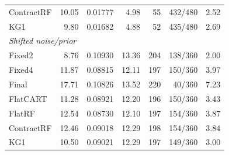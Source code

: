 \begin{table}[!htbp]
\begin{tabular}{@{}lrrrrrr@{}}
ContractRF & 10.05 & 0.01777 & 4.98 & 55 & 432/480 & 2.52\\
KG1 & 9.80 & 0.01682 & 4.88 & 52 & 435/480 & 2.69\\
\multicolumn{7}{l}{\textit{Shifted noise/prior}}\\
Fixed2 & 8.76 & 0.10930 & 13.36 & 204 & 138/360 & 2.00\\
Fixed4 & 11.87 & 0.08815 & 12.11 & 197 & 150/360 & 3.97\\
Final & 17.71 & 0.10826 & 13.52 & 220 & 40/360 & 7.23\\
FlatCART & 11.28 & 0.08921 & 12.20 & 196 & 150/360 & 3.43\\
FlatRF & 12.54 & 0.08730 & 12.10 & 197 & 154/360 & 3.87\\
ContractRF & 12.46 & 0.09018 & 12.29 & 198 & 154/360 & 3.84\\
KG1 & 10.50 & 0.09021 & 12.29 & 197 & 149/360 & 3.00\\
\bottomrule\end{tabular}\end{table}

